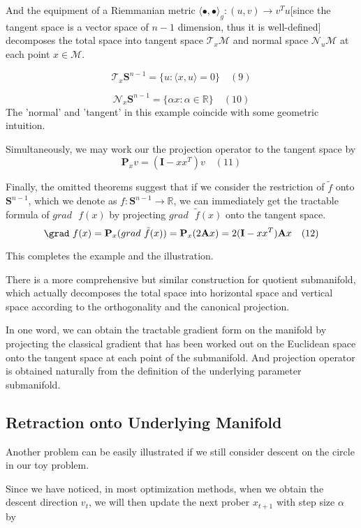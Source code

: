 \documentclass[letterpaper]{article}
\begin{document}
And the equipment of a Riemmanian metric $\langle\bullet,\bullet\rangle_g:(\mathit{u},\mathit{v})\to{v^{T}u}$[since the tangent space is a vector space of $n-1$ dimension, thus it is well-defined] decomposes the
total space into tangent space $\mathcal{T}_x\mathcal{M}$ and normal space $\mathcal{N}_u\mathcal{M}$ at each point $x\in\mathcal{M}$.

$$
    \mathcal{T}_x{\mathbf{S}^{n-1}}=\{u: \langle{}x,u\rangle=0 \} \quad (9)
$$

$$
   \mathcal{N}_x{\mathbf{S}^{n-1}}=\{\alpha{x}: \alpha\in\mathbb{R}\} \quad (10)
$$
The 'normal' and 'tangent' in this example coincide with some geometric intuition.

Simultaneously, we may work our the projection operator to the tangent space by
$$
    \mathbf{P}_x\mathit{v}=(\mathbf{I}-xx^{T})\mathit{v} \quad (11)
$$


Finally, the omitted theorems suggest that if we consider the restriction of $\tilde{f}$ onto $\mathbf{S}^{n-1}$, which we denote as $f:\mathbf{S}^{n-1}\to\mathbb{R}$,
we can immediately get the tractable formula of $grad\text{ }f(x)$ by projecting $grad\text{ }\tilde{f}(x)$ onto the tangent space.
$$
    \grad\text{ }f(x)=\mathbf{P}_x(grad\text{ }\tilde{f}(x))=\mathbf{P}_x(2\mathbf{A}x)=2(\mathbf{I}-xx^{T})\mathbf{A}x \quad (12)
$$

This completes the example and the illustration.

There is a more comprehensive but similar construction for quotient submanifold, which actually decomposes the total space into horizontal space and vertical space according to
the orthogonality and the canonical projection.

In one word, we can obtain the tractable gradient form on the manifold by projecting the classical gradient that has been worked out on the Euclidean space onto the tangent space at each point of the submanifold. And
projection operator is obtained naturally from the definition of the underlying parameter submanifold.

\subsection{Retraction onto Underlying Manifold}
Another problem can be easily illustrated if we still consider descent on the circle in our toy problem.

Since we have noticed, in most optimization methods, when we obtain the descent direction $\mathit{v}_t$,
we will then update the next prober $x_{t+1}$ with step size $\alpha$ by
\end{document}
